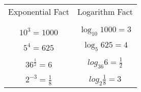 \begin{tabular}{cc}
	Exponential Fact & Logarithm Fact \\ \\
	\hline \\
	\(10^3 = 1000\) & \(\log_{10}1000 = 3\) \\ \\
	\(5^4 = 625\) & \(\log_5{625} = 4\) \\ \\
	\(36^{\frac{1}{2}} = 6\) & \(log_{36}6 = \frac{1}{2}\) \\ \\
	\(2^{-3} = \frac{1}{8}\) & \(log_2{\frac{1}{8}} = 3\)
\end{tabular}